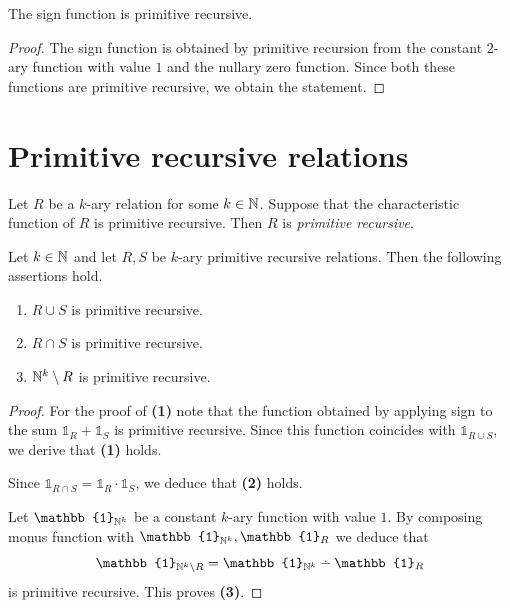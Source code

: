\documentclass[10pt]{amsart}
\begin{document}
\begin{proposition}\label{proposition:zery_indicator_is_primitive_recursive}
	The sign function is primitive recursive.
\end{proposition}
\begin{proof}
	The sign function is obtained by primitive recursion from the constant $2$-ary function with value $1$ and the nullary zero function. Since both these functions are primitive recursive, we obtain the statement.
\end{proof}

\section{Primitive recursive relations}

\begin{definition}
	Let $R$ be a $k$-ary relation for some $k \in {\mathbb N}$. Suppose that the characteristic function of $R$ is primitive recursive. Then $R$ is \textit{primitive recursive}.
\end{definition}

\begin{proposition}\label{proposition:primitive_recursive_relations_form_boolean_algebra}
	Let $k\in {\mathbb N}$ and let $R, S$ be $k$-ary primitive recursive relations. Then the following assertions hold.
	\begin{enumerate}[label=\emph{\textbf{(\arabic*)}}, leftmargin=*]
		\item $R \cup S$ is primitive recursive.
		\item $R \cap S$ is primitive recursive.
		\item ${\mathbb N}^k \setminus R$ is primitive recursive.
	\end{enumerate}
\end{proposition}
\begin{proof}
	For the proof of \textbf{(1)} note that the function obtained by applying sign to the sum $\mathbb{1}_R + \mathbb{1}_{S}$ is primitive recursive. Since this function coincides with $\mathbb{1}_{R\cup S}$, we derive that \textbf{(1)} holds.

	Since $\mathbb{1}_{R\cap S} = \mathbb{1}_{R}\cdot \mathbb{1}_S$, we deduce that \textbf{(2)} holds.

	Let $\mathbb{1}_{\NN^k}$ be a constant $k$-ary function with value $1$. By composing monus function with $\mathbb{1}_{\NN^k}, \mathbb{1}_R$ we deduce that $$\mathbb{1}_{\NN^k\setminus R} = \mathbb{1}_{\NN^k} \dotminus \mathbb{1}_R$$
	is primitive recursive. This proves \textbf{(3)}.
\end{proof}
\end{document}
